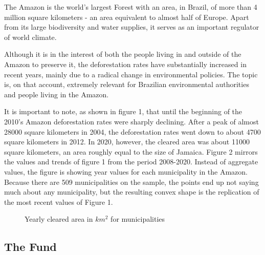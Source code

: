 \documentclass[11pt, oneside]{article}   	%
\begin{document}
The Amazon is the world's largest Forest with an area, in Brazil, of more than 4 million square kilometers - an area equivalent to almost half of Europe. Apart from its large biodiversity and water supplies, it serves as an important regulator of world climate. 

Although it is in the interest of both the people living in and outside of the Amazon to preserve it, the deforestation rates have substantially increased in recent years, mainly due to a radical change in environmental policies. The topic is, on that account, extremely relevant for Brazilian environmental authorities and people living in the Amazon.



It is important to note, as shown in figure 1, that until the beginning of the 2010's Amazon deforestation rates were sharply declining. After a peak of almost 28000 square kilometers in 2004, the deforestation rates went down to about 4700 square kilometers in 2012. In 2020, however, the cleared area was about 11000 square kilometers, an area roughly equal to the size of Jamaica. Figure 2 mirrors the values and trends of figure 1 from the period 2008-2020. Instead of aggregate values, the figure is showing year values for each municipality in the Amazon. Because there are 509 municipalities on the sample, the points end up not saying much about any municipality, but the resulting convex shape is the replication of the most recent values of Figure 1. 

\begin{figure}[!ht]
\centering

\caption{Yearly cleared area in $km^{2}$ for municipalities}
\end{figure}


\subsection{The Fund}
\end{document}
